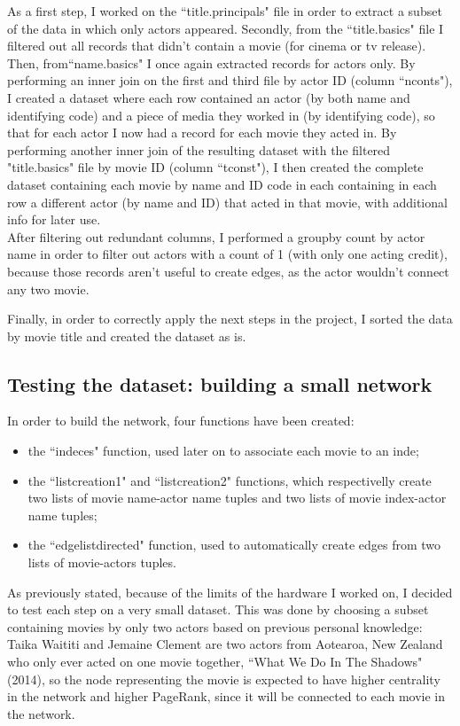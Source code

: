 \documentclass[11pt]{article}
\begin{document}
As a first step, I worked on the ``title.principals" file in order to extract a subset of the data in which only actors appeared. 
Secondly, from the ``title.basics" file I filtered out all records that didn't contain a movie (for cinema or tv release).
Then,  from``name.basics" I once again extracted records for actors only. 
By performing an inner join on the first and third file by actor ID (column ``nconts"), I created a dataset where each row contained an actor (by both name and identifying code) and a piece of media they worked in (by identifying code), so that for each actor I now had a record for each movie they acted in. By performing another inner join of the resulting dataset with the filtered "title.basics" file by movie ID (column ``tconst"), I then created the complete dataset containing each movie by name and ID code  in each containing in each row a different actor (by name and ID) that acted in that movie, with additional info for later use.\\

After filtering out redundant columns, I performed a groupby count by actor name in order to filter out actors with a count of 1 (with only one acting credit), because those records aren't useful to create edges, as the actor wouldn't connect any two movie. 

Finally, in order to correctly apply the next steps in the project, I sorted the data by movie title and created the dataset as is.

\subsection{Testing the dataset: building a small network}

In order to build the network, four functions have been created:
\begin{itemize}
  \item the ``indeces" function, used later on to associate each movie to an inde;
  \item the ``listcreation1" and ``listcreation2" functions, which respectivelly create two lists of movie name-actor name tuples and two lists of movie index-actor name tuples;
  \item the ``edgelistdirected" function, used to automatically create edges from two lists of movie-actors tuples.
\end{itemize}

As previously stated, because of the limits of the hardware I worked on, I decided to test each step on a very small dataset. This was done by choosing a subset containing movies by only two actors based on previous personal knowledge: Taika Waititi and Jemaine Clement are two actors from Aotearoa, New Zealand who only ever acted on one movie together, ``What We Do In The Shadows" (2014), so the node representing the movie is expected to have higher centrality in the network and higher PageRank, since it will be connected to each movie in the network.\\
\end{document}
